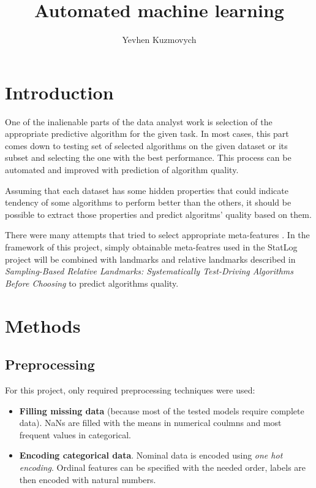 \documentclass[hidelinks, english]{mvi-report}
\title{Automated machine learning}
\author{Yevhen Kuzmovych}
\affiliation{ČVUT - FIT}
\begin{document}
\maketitle

\section{Introduction}

One of the inalienable parts of the data analyst work is selection of the appropriate predictive algorithm for
the given task. In most cases, this part comes down to testing set of selected algorithms on the given dataset or its
subset and selecting the one with the best performance. This process can be automated and improved with prediction of
algorithm quality.

Assuming that each dataset has some hidden properties that could indicate tendency of some algorithms to perform
better than the others, it should be possible to extract those properties and predict algoritms' quality based on them.

There were many attempts that tried to select appropriate meta-features
\cite{sampling-based-relative-landmarks}\cite{statlog}\cite{meta-learning-for-algorithm-selection}. In the framework of
this project, simply obtainable meta-featres used in the StatLog project\cite{statlog} will be combined with landmarks
and relative landmarks described in \textit{Sampling-Based Relative Landmarks: Systematically Test-Driving Algorithms
Before Choosing}\cite{sampling-based-relative-landmarks} to predict algorithms quality.


\section{Methods}



\subsection{Preprocessing}
For this project, only required preprocessing techniques were used:

\begin{itemize}
    \item \textbf{Filling missing data} (because most of the tested models require complete data). NaNs are filled with
    the means in numerical coulmns and most frequent values in categorical.
    \item \textbf{Encoding categorical data}. Nominal data is encoded using \textit{one hot encoding}. Ordinal features
    can be specified with the needed order, labels are then encoded with natural numbers.
\end{itemize}
\end{document}
